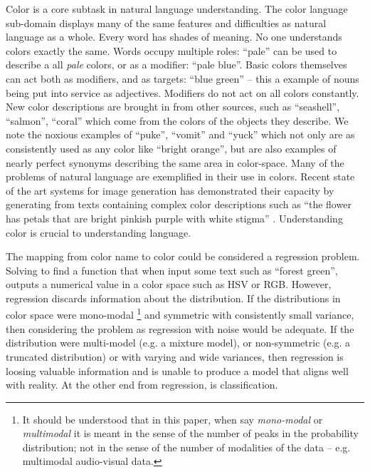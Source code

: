 \documentclass[11pt,letterpaper]{article}
\newcommand{\parencite}{\cite}
\begin{document}
Color is a core subtask in natural language understanding.
The color language sub-domain displays many of the same features and difficulties as natural language as a whole.
Every word has shades of meaning.
No one understands colors exactly the same.
Words occupy multiple roles: ``pale'' can be used to describe a all \emph{pale} colors, or as a modifier: ``pale blue''.
Basic colors themselves can act both as modifiers, and as targets: ``blue green'' -- this a example of nouns being put into service as adjectives.
Modifiers do not act on all colors constantly.
New color descriptions are brought in from other sources, such as ``seashell'', ``salmon'', ``coral'' which come from the colors of the objects they describe.
We note the noxious examples of ``puke'', ``vomit'' and ``yuck'' which not only are as consistently used as any color like ``bright orange'', but are also examples of nearly perfect synonyms describing the same area in color-space.
Many of the problems of natural language are exemplified in their use in colors.
Recent state of the art systems for image generation has demonstrated their capacity by generating from texts containing complex color descriptions such as ``the flower has petals that 
are bright pinkish purple with white stigma'' \parencite{reed2016generative, 2015arXiv151102793M}.
Understanding color is crucial to understanding language. 


The mapping from color name to color could be considered a regression problem. Solving to find a function that when input some text such as ``forest green'', outputs a numerical value in a color space such as HSV or RGB.
However, regression discards information about the distribution.
If the distributions in color space were mono-modal
\footnote{It should be understood that in this paper, when say \emph{mono-modal} or \emph{multimodal} it is meant in the sense of the number of peaks in the probability distribution; not in the sense of the number of modalities of the data -- e.g. multimodal audio-visual data.}
 and symmetric with consistently small variance, then considering the problem as regression with noise would be adequate.
If the distribution were multi-model (e.g. a mixture model), or non-symmetric (e.g. a truncated distribution) or with varying and wide variances, then regression is loosing valuable information and is unable to produce a model that aligns well with reality.
At the other end from regression, is classification.
\end{document}
